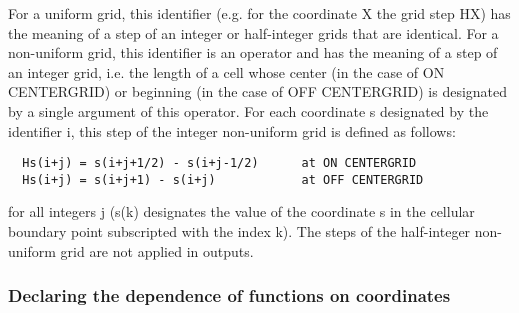 For a  uniform grid, this identifier (e.g. for the coordinate X the grid
step HX) has the meaning of a step of an  integer or  half-integer grids
that  are  identical.  For  a  non-uniform  grid,  this identifier is an
operator and has the  meaning of  a step  of an  integer grid,  i.e. the
length  of  a  cell  whose  center  (in  the  case  of ON CENTERGRID) or
beginning (in the case of OFF  CENTERGRID)  is  designated  by  a single
argument  of  this  operator.  For  each  coordinate s designated by the
identifier i, this step of the  integer non-uniform  grid is  defined as
follows:
\begin{verbatim}
  Hs(i+j) = s(i+j+1/2) - s(i+j-1/2)      at ON CENTERGRID
  Hs(i+j) = s(i+j+1) - s(i+j)            at OFF CENTERGRID
\end{verbatim}
for all integers j (s(k) designates the value of the coordinate s in the
cellular boundary point subscripted with the index k). The steps  of the
half-integer non-uniform grid are not applied in outputs.


\subsubsection{Declaring the dependence of functions on coordinates}


